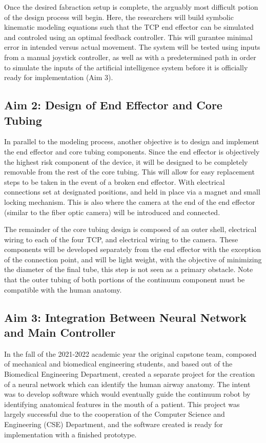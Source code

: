 	Once the desired fabraction setup is complete, the arguably most difficult potion of the design process will begin. Here, the researchers will build symbolic kinematic modeling equations such that the TCP end effector can be simulated and controled using an optimal feedback controller. This will gurantee minimal error in intended versus actual movement. The system will be tested using inputs from a manual joystick controller, as well as with a predetermined path in order to simulate the inputs of the artificial intelligence system before it is officially ready for implementation (Aim 3).
	
	\subsection{Aim 2: Design of End Effector and Core Tubing}
	\label{subsect:aim2}
	
	In parallel to the modeling process, another objective is to design and implement the end effector and core tubing components. Since the end effector is objectively the highest risk component of the device, it will be designed to be completely removable from the rest of the core tubing. This will allow for easy replacement steps to be taken in the event of a broken end effector. With electrical connections set at designated positions, and held in place via a magnet and small locking mechanism.	 This is also where the camera at the end of the end effector (similar to the fiber optic camera) will be introduced and connected.
	
	The remainder of the core tubing design is composed of an outer shell, electrical wiring to each of the four TCP, and electrical wiring to the camera. These components will be developed separately from the end effector with the exception of the connection point, and will be light weight, with the objective of minimizing the diameter of the final tube, this step is not seen as a primary obstacle. Note that the outer tubing of both portions of the continuum component must be compatible with the human anatomy.
	
	\subsection{Aim 3: Integration Between Neural Network and Main Controller}
	\label{subsect:aim3}
	
	In the fall of the 2021-2022 academic year the original capstone team, composed of mechanical and biomedical engineering students, and based out of the Biomedical Engineering Department, created a separate project for the creation of a neural network which can identify the human airway anatomy. The intent was to develop software which would eventually guide the continuum robot by identifying anatomical features in the mouth of a patient. This project was largely successful due to the cooperation of the Computer Science and Engineering (CSE) Department, and the software created is ready for implementation with a finished prototype.
	
